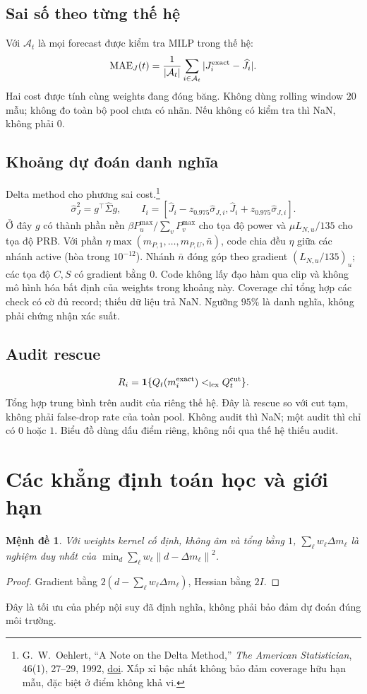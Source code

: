 \documentclass[11pt,a4paper]{article}
\newcommand{\ind}{\mathbf1}
\newcommand{\norm}[1]{\left\lVert#1\right\rVert}
\newtheorem{proposition}{Mệnh đề}
\begin{document}
\subsection{Sai số theo từng thế hệ}
Với $\mathcal A_t$ là mọi forecast được kiểm tra MILP trong thế hệ:
\[
{\rm MAE}_J(t)=\frac1{|\mathcal A_t|}\sum_{i\in\mathcal A_t}|J_i^{\rm exact}-\widehat J_i|.
\]
Hai cost được tính cùng weights đang đóng băng. Không dùng rolling window $20$ mẫu; không đo toàn bộ pool chưa có nhãn.
Nếu không có kiểm tra thì NaN, không phải $0$.

\subsection{Khoảng dự đoán danh nghĩa}
Delta method cho phương sai cost.\footnote{G.~W.~Oehlert, ``A Note on the Delta Method,'' \emph{The American Statistician}, 46(1), 27--29, 1992, \href{https://doi.org/10.1080/00031305.1992.10475842}{doi}. Xấp xỉ bậc nhất không bảo đảm coverage hữu hạn mẫu, đặc biệt ở điểm không khả vi.}
\[
\widehat\sigma_J^2=g^\top\widehat\Sigma g,\qquad
I_i=[\widehat J_i-z_{0.975}\widehat\sigma_{J,i},\widehat J_i+z_{0.975}\widehat\sigma_{J,i}].
\]
Ở đây $g$ có thành phần nền $\beta P_u^{\max}/\sum_vP_v^{\max}$ cho tọa độ power và $\mu L_{N,u}/135$ cho tọa độ PRB.
Với phần $\eta\max(m_{P,1},\ldots,m_{P,U},\bar n)$, code chia đều $\eta$ giữa các nhánh active (hòa trong $10^{-12}$). Nhánh $\bar n$ đóng góp theo gradient $(L_{N,u}/135)_u$; các tọa độ $C,S$ có gradient bằng $0$.
Code không lấy đạo hàm qua clip và không mô hình hóa bất định của weights trong khoảng này.
Coverage chỉ tổng hợp các check có cờ đủ record; thiếu dữ liệu trả NaN.
Ngưỡng $95\%$ là danh nghĩa, không phải chứng nhận xác suất.

\subsection{Audit rescue}
\[
R_i=\ind\{Q_t(m_i^{\rm exact})<_{\rm lex}Q_t^{\rm cut}\}.
\]
Tổng hợp trung bình trên audit của riêng thế hệ. Đây là rescue so với cut tạm, không phải false-drop rate của toàn pool.
Không audit thì NaN; một audit thì chỉ có $0$ hoặc $1$. Biểu đồ dùng dấu điểm riêng, không nối qua thế hệ thiếu audit.

\section{Các khẳng định toán học và giới hạn}
\begin{proposition}
Với weights kernel cố định, không âm và tổng bằng $1$, $\sum_\ell w_\ell\Delta m_\ell$ là nghiệm duy nhất của
$\min_d\sum_\ell w_\ell\norm{d-\Delta m_\ell}^2$.
\end{proposition}
\begin{proof}Gradient bằng $2(d-\sum_\ell w_\ell\Delta m_\ell)$, Hessian bằng $2I$.\end{proof}
Đây là tối ưu của phép nội suy đã định nghĩa, không phải bảo đảm dự đoán đúng môi trường.
\end{document}
